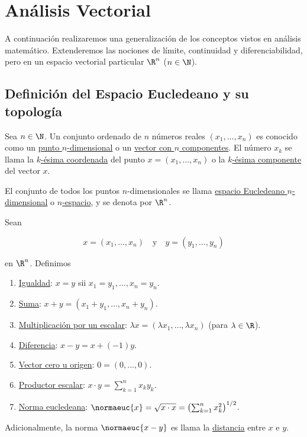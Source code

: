 \section{Análisis Vectorial}

A continuación realizaremos una generalización de los conceptos vistos en análisis matemático. Extenderemos las nociones de límite, continuidad y diferenciabilidad, pero en un espacio vectorial particular $\R^n$ ($n \in \N$).

\subsection{Definición del Espacio Eucledeano y su topología}

\begin{defn}
    Sea $n \in \N$. Un conjunto ordenado de $n$ números reales $(x_1, \dots, x_n)$ es conocido como un \ul{punto $n$-dimensional} o un \ul{vector con $n$ componentes}. El número $x_k$ se llama la \ul{$k$-ésima coordenada} del punto $x = (x_1, \dots, x_n)$ o la \ul{$k$-ésima componente} del vector $x$.
    
    El conjunto de todos los puntos $n$-dimensionales se llama \ul{espacio Eucledeano $n$-dimensional} o \ul{$n$-espacio}, y se denota por $\R^n$.
\end{defn}

\begin{defn}
    Sean
    
    \[
    x = (x_1, \dots, x_n) \quad \text{y} \quad y = (y_1, \dots, y_n)
    \]
    
    en $\R^n$. Definimos
    
    \begin{enumerate}
        \item \ul{Igualdad}: $x=y$ sii $x_1 = y_1, \dots, x_n = y_n$.
        \item \ul{Suma}: $x + y = (x_1 + y_1, \dots, x_n + y_n)$.
        \item \ul{Multiplicación por un escalar}: $\lambda x = (\lambda x_1, \dots, \lambda x_n)$ (para $\lambda \in \R$).
        \item \ul{Diferencia}: $x-y = x + (-1)y$.
        \item \ul{Vector cero u origen}: $0 = (0, \dots, 0)$.
        \item \ul{Productor escalar}: $x \cdot y = \sum_{k=1}^n x_ky_k$.
        \item \ul{Norma eucledeana}: $\normaeuc{x} = \sqrt{x \cdot x} = \left( \sum_{k=1}^n x_k^2 \right)^{1/2}$.
    \end{enumerate}
    
    Adicionalmente, la norma $\normaeuc{x-y}$ es llama la \ul{distancia} entre $x$ e $y$.
\end{defn}

